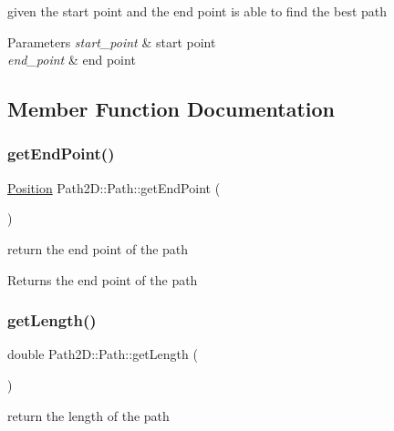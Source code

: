 given the start point and the end point is able to find the best path 


\begin{DoxyParams}{Parameters}
{\em start\+\_\+point} & start point \\
\hline
{\em end\+\_\+point} & end point \\
\hline
\end{DoxyParams}


\subsection{Member Function Documentation}
\mbox{\label{class_path2_d_1_1_path_a66b401fb426001c93d14f4a140834ee2}} 
\subsubsection{\texorpdfstring{get\+End\+Point()}{getEndPoint()}}
{\footnotesize\ttfamily \mbox{\hyperlink{class_path2_d_1_1_element_1_1_position}{Position}} Path2\+D\+::\+Path\+::get\+End\+Point (\begin{DoxyParamCaption}{ }\end{DoxyParamCaption})}



return the end point of the path 

\begin{DoxyReturn}{Returns}
the end point of the path 
\end{DoxyReturn}
\mbox{\label{class_path2_d_1_1_path_a5460a949ed5a26df41cd81a7884dc144}} 
\subsubsection{\texorpdfstring{get\+Length()}{getLength()}}
{\footnotesize\ttfamily double Path2\+D\+::\+Path\+::get\+Length (\begin{DoxyParamCaption}{ }\end{DoxyParamCaption})}



return the length of the path 

